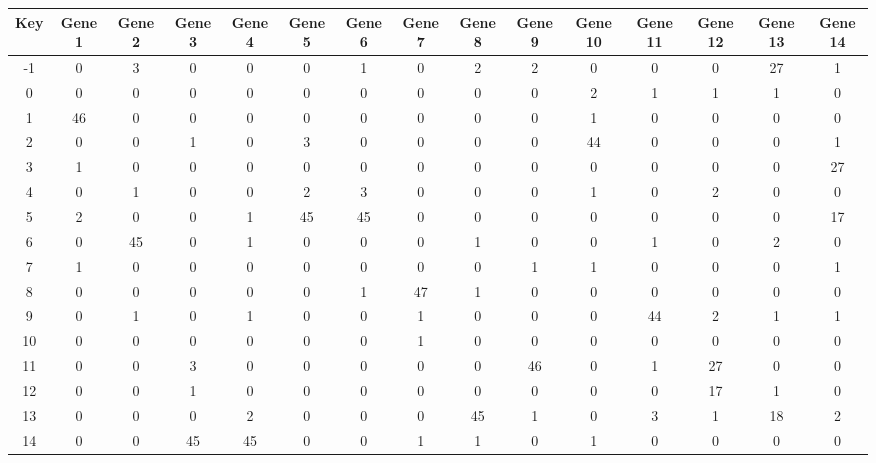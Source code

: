 \begin{tabular}{|c|c|c|c|c|c|c|c|c|c|c|c|c|c|c|}
\hline
Key & Gene 1 & Gene 2 & Gene 3 & Gene 4 & Gene 5 & Gene 6 & Gene 7 & Gene 8 & Gene 9 & Gene 10 & Gene 11 & Gene 12 & Gene 13 & Gene 14 \\
\hline
-1 & 0 & 3 & 0 & 0 & 0 & 1 & 0 & 2 & 2 & 0 & 0 & 0 & 27 & 1 \\
0 & 0 & 0 & 0 & 0 & 0 & 0 & 0 & 0 & 0 & 2 & 1 & 1 & 1 & 0 \\
1 & 46 & 0 & 0 & 0 & 0 & 0 & 0 & 0 & 0 & 1 & 0 & 0 & 0 & 0 \\
2 & 0 & 0 & 1 & 0 & 3 & 0 & 0 & 0 & 0 & 44 & 0 & 0 & 0 & 1 \\
3 & 1 & 0 & 0 & 0 & 0 & 0 & 0 & 0 & 0 & 0 & 0 & 0 & 0 & 27 \\
4 & 0 & 1 & 0 & 0 & 2 & 3 & 0 & 0 & 0 & 1 & 0 & 2 & 0 & 0 \\
5 & 2 & 0 & 0 & 1 & 45 & 45 & 0 & 0 & 0 & 0 & 0 & 0 & 0 & 17 \\
6 & 0 & 45 & 0 & 1 & 0 & 0 & 0 & 1 & 0 & 0 & 1 & 0 & 2 & 0 \\
7 & 1 & 0 & 0 & 0 & 0 & 0 & 0 & 0 & 1 & 1 & 0 & 0 & 0 & 1 \\
8 & 0 & 0 & 0 & 0 & 0 & 1 & 47 & 1 & 0 & 0 & 0 & 0 & 0 & 0 \\
9 & 0 & 1 & 0 & 1 & 0 & 0 & 1 & 0 & 0 & 0 & 44 & 2 & 1 & 1 \\
10 & 0 & 0 & 0 & 0 & 0 & 0 & 1 & 0 & 0 & 0 & 0 & 0 & 0 & 0 \\
11 & 0 & 0 & 3 & 0 & 0 & 0 & 0 & 0 & 46 & 0 & 1 & 27 & 0 & 0 \\
12 & 0 & 0 & 1 & 0 & 0 & 0 & 0 & 0 & 0 & 0 & 0 & 17 & 1 & 0 \\
13 & 0 & 0 & 0 & 2 & 0 & 0 & 0 & 45 & 1 & 0 & 3 & 1 & 18 & 2 \\
14 & 0 & 0 & 45 & 45 & 0 & 0 & 1 & 1 & 0 & 1 & 0 & 0 & 0 & 0 \\
\hline
\end{tabular}